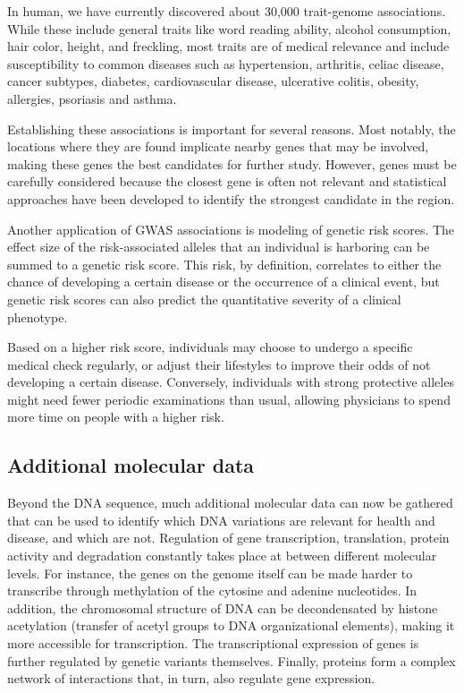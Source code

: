 In human, we have currently discovered about 30,000 trait-genome associations\cite{Welter_2013}.
While these include general traits like word reading ability, alcohol consumption, hair color, height, and freckling, most traits are of medical relevance and include susceptibility to common diseases such as hypertension, arthritis, celiac disease, cancer subtypes, diabetes, cardiovascular disease, ulcerative colitis, obesity, allergies, psoriasis and asthma.

Establishing these associations is important for several reasons.
Most notably, the locations where they are found implicate nearby genes that may be involved, making these genes the best candidates for further study.
However, genes must be carefully considered because the closest gene is often not relevant and statistical approaches have been developed\cite{Zhu_2016} to identify the strongest candidate in the region.

Another application of GWAS associations is modeling of genetic risk scores.
The effect size of the risk-associated alleles that an individual is harboring can be summed to a genetic risk score\cite{Dudbridge_2013}.
This risk, by definition, correlates to either the chance of developing a certain disease or the occurrence of a clinical event\cite{Malik_2014}, but genetic risk scores can also predict the quantitative severity of a clinical phenotype\cite{Belsky_2013}.

Based on a higher risk score, individuals may choose to undergo a specific medical check regularly, or adjust their lifestyles to improve their odds of not developing a certain disease.
Conversely, individuals with strong protective alleles might need fewer periodic examinations than usual, allowing physicians to spend more time on people with a higher risk.

\subsection{Additional molecular data}

Beyond the DNA sequence, much additional molecular data can now be gathered that can be used to identify which DNA variations are relevant for health and disease, and which are not.
Regulation of gene transcription, translation, protein activity and degradation constantly takes place at between different molecular levels.
For instance, the genes on the genome itself can be made harder to transcribe through methylation of the cytosine and adenine nucleotides\cite{Bird_2002}.
In addition, the chromosomal structure of DNA can be decondensated by histone acetylation (transfer of acetyl groups to DNA organizational elements), making it more accessible for transcription\cite{Eberharter_2002}.
The transcriptional expression of genes is further regulated by genetic variants themselves\cite{Albert_2015}.
Finally, proteins form a complex network of interactions\cite{Phizicky_1995} that, in turn, also regulate gene expression\cite{Taniguchi_2012}.

